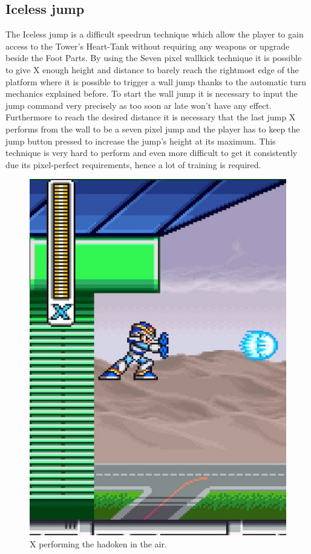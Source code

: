 \subsection{Iceless jump}\label{misc:iceless}
The Iceless jump is a difficult speedrun technique which allow the player to gain access to the Tower's Heart-Tank without requiring any weapons or upgrade beside the Foot Parts. By using the Seven pixel wallkick technique it is possible to give X enough height and distance to barely reach the rightmost edge of the platform where it is possible to trigger a wall jump thanks to the automatic turn mechanics explained before. To start the wall jump it is necessary to input the jump command very precisely as too soon ar late won't have any effect. Furthermore to reach the desired distance it is necessary that the last jump X performs from the wall to be a seven pixel jump and the player has to keep the jump button pressed to increase the jump's height at its maximum. 
This technique is very hard to perform and even more difficult to get it consistently due its pixel-perfect requirements, hence a lot of training is required.

\begin{figure}[htp]
	\centering
	\includegraphics[width=0.4\linewidth]{figures/X1/Miscs/Flying_hadoken.jpg}
	\caption{X performing the hadoken in the air.}
\end{figure}
